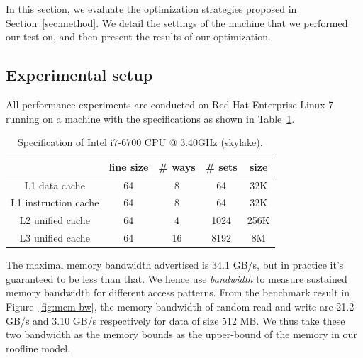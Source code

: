 
In this section, we evaluate the optimization strategies proposed in Section~\ref{sec:method}.
We detail the settings of the machine that we performed our test on, and then
present the results of our optimization.

\subsection{Experimental setup}

All performance experiments are conducted on Red Hat Enterprise Linux 7 running on a machine with the specifications as shown in Table~\ref{tab:cpu-info}.
\begin{table}
\begin{center}
\begin{tabular}{ | c | c | c | c | c | }
 \hline
     & line size & \# ways & \# sets  & size\\  \hline
 L1 data cache        & 64 &  8 &   64 & 32K \\  \hline
 L1 instruction cache & 64 &  8 &   64 & 32K \\  \hline
 L2 unified cache     & 64 &  4 & 1024 & 256K \\ \hline
 L3 unified cache     & 64 & 16 & 8192 & 8M \\  
 \hline
\end{tabular}
\caption{Specification of Intel i7-6700 CPU @ 3.40GHz (skylake).\cite{Intel_i7-6700}}
\label{tab:cpu-info}
\end{center}
\end{table}

The maximal memory bandwidth advertised is 34.1 GB/s, but in practice it's guaranteed to be less than that. We hence use \textit{bandwidth}\cite{bandwidth} to measure sustained memory bandwidth for different access patterns. From the benchmark result in Figure~\ref{fig:mem-bw}, the memory bandwidth of random read and write are 21.2 GB/s and 3.10 GB/s respectively for data of size 512 MB. We thus take these two bandwidth as the memory bounds as the upper-bound of the memory in our roofline model.


